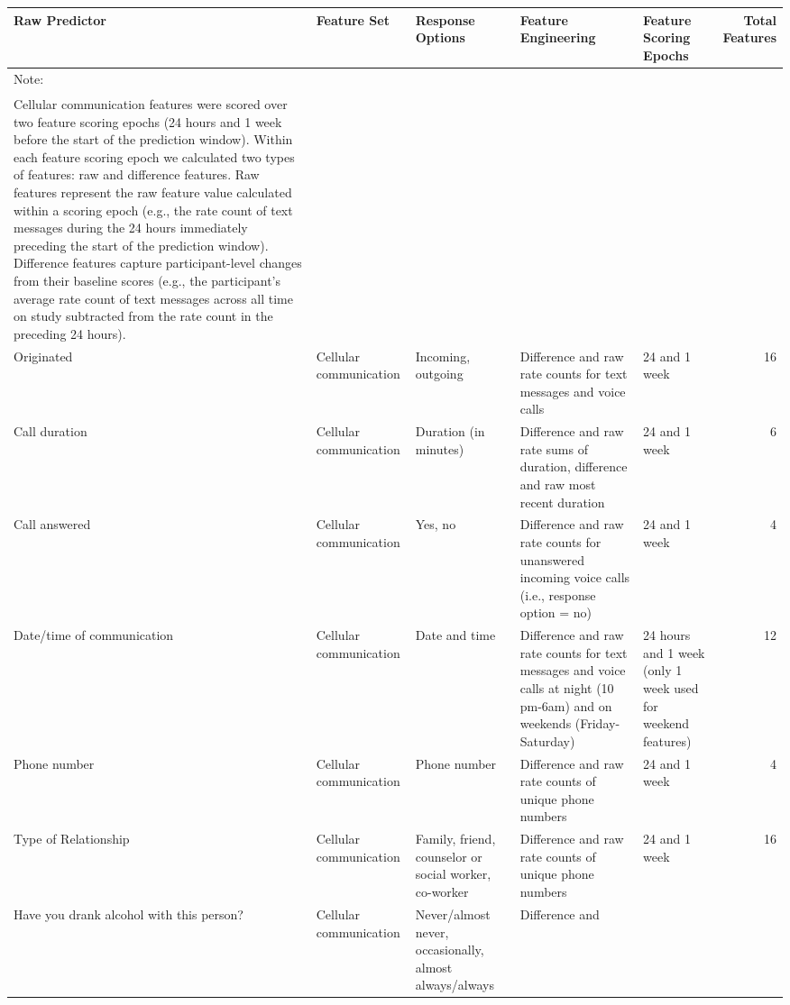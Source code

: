 \documentclass[
  letterpaper,
  DIV=11,
  numbers=noendperiod]{scrartcl}
\begin{document}
{

\begin{longtable}[]{@{}lllllr@{}}

\toprule\noalign{}
Raw Predictor & Feature Set & Response Options & Feature Engineering &
Feature Scoring Epochs & Total Features \\
\midrule\noalign{}
\endhead
\midrule\noalign{}
{Note: } & & & & & \\
\textsuperscript{} Cellular communication features were scored over two
feature scoring epochs (24 hours and 1 week before the start of the
prediction window). Within each feature scoring epoch we calculated two
types of features: raw and difference features. Raw features represent
the raw feature value calculated within a scoring epoch (e.g., the rate
count of text messages during the 24 hours immediately preceding the
start of the prediction window). Difference features capture
participant-level changes from their baseline scores (e.g., the
participant's average rate count of text messages across all time on
study subtracted from the rate count in the preceding 24 hours). & & & &
& \\
\bottomrule\noalign{}
\endlastfoot
Originated & Cellular communication & Incoming, outgoing & Difference
and raw rate counts for text messages and voice calls & 24 and 1 week &
16 \\
Call duration & Cellular communication & Duration (in minutes) &
Difference and raw rate sums of duration, difference and raw most recent
duration & 24 and 1 week & 6 \\
Call answered & Cellular communication & Yes, no & Difference and raw
rate counts for unanswered incoming voice calls (i.e., response option =
no) & 24 and 1 week & 4 \\
Date/time of communication & Cellular communication & Date and time &
Difference and raw rate counts for text messages and voice calls at
night (10 pm-6am) and on weekends (Friday-Saturday) & 24 hours and 1
week (only 1 week used for weekend features) & 12 \\
Phone number & Cellular communication & Phone number & Difference and
raw rate counts of unique phone numbers & 24 and 1 week & 4 \\
Type of Relationship & Cellular communication & Family, friend,
counselor or social worker, co-worker & Difference and raw rate counts
of unique phone numbers & 24 and 1 week & 16 \\
Have you drank alcohol with this person? & Cellular communication &
Never/almost never, occasionally, almost always/always & Difference and

\end{longtable}}
\end{document}
